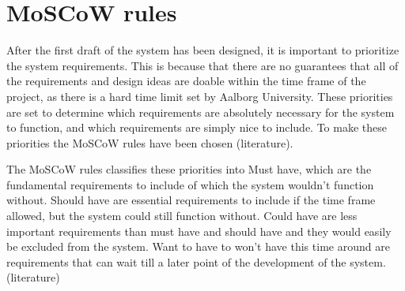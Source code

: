 \section{MoSCoW rules}

After the first draft of the system has been designed, it is important to prioritize the system requirements. This is because that there are no guarantees that all of the requirements and design ideas are doable within the time frame of the project, as there is a hard time limit set by Aalborg University. These priorities are set to determine which requirements are absolutely necessary for the system to function, and which requirements are simply nice to include. To make these priorities the MoSCoW rules have been chosen (literature). 

The MoSCoW rules classifies these priorities into Must have, which are the fundamental requirements to include of which the system wouldn’t function without. Should have are essential requirements to include if the time frame allowed, but the system could still function without. Could have are less important requirements than must have and should have and they would easily be excluded from the system. Want to have to won’t have this time around are requirements that can wait till a later point of the development of the system. (literature)